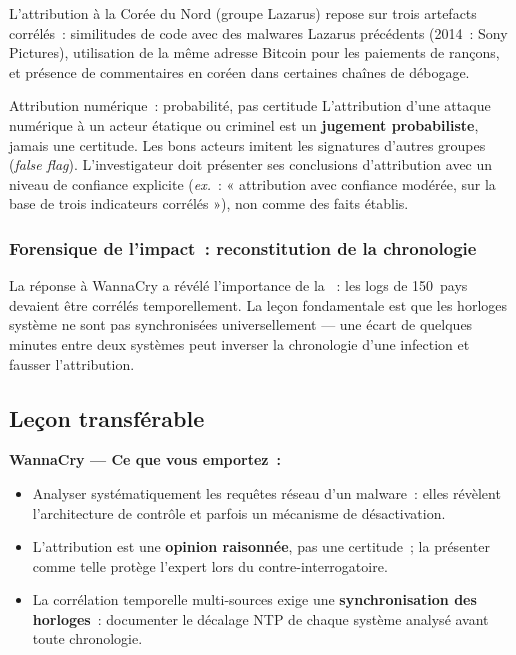 L'attribution à la Corée du Nord (groupe Lazarus) repose sur trois
artefacts corrélés~: similitudes de code avec des malwares Lazarus
précédents (2014~: Sony Pictures), utilisation de la même adresse
Bitcoin pour les paiements de rançons, et présence de commentaires
en coréen dans certaines chaînes de débogage.

\begin{boiteRemarque}{Attribution numérique~: probabilité, pas certitude}
L'attribution d'une attaque numérique à un acteur étatique ou
criminel est un \textbf{jugement probabiliste}, jamais une certitude.
Les bons acteurs imitent les signatures d'autres groupes (\textit{false
flag}). L'investigateur doit présenter ses conclusions d'attribution avec
un niveau de confiance explicite (\textit{ex.}~: « attribution avec
confiance modérée, sur la base de trois indicateurs corrélés »), non
comme des faits établis.
\end{boiteRemarque}

\subsubsection{Forensique de l'impact~: reconstitution de la chronologie}

La réponse à WannaCry a révélé l'importance de la
~:
les logs de 150~pays devaient être corrélés temporellement. La
leçon fondamentale est que les horloges système ne sont pas synchronisées
universellement --- une écart de quelques minutes entre deux systèmes
peut inverser la chronologie d'une infection et fausser l'attribution.

\subsection{Leçon transférable}

\begin{boxresume}
\textbf{WannaCry --- Ce que vous emportez~:}
\begin{itemize}
    \item Analyser systématiquement les requêtes réseau d'un malware~:
          elles révèlent l'architecture de contrôle et parfois un
          mécanisme de désactivation.
    \item L'attribution est une \textbf{opinion raisonnée}, pas une
          certitude~; la présenter comme telle protège l'expert
          lors du contre-interrogatoire.
    \item La corrélation temporelle multi-sources exige une
          \textbf{synchronisation des horloges}~: documenter le
          décalage NTP de chaque système analysé avant toute chronologie.
\end{itemize}
\end{boxresume}

